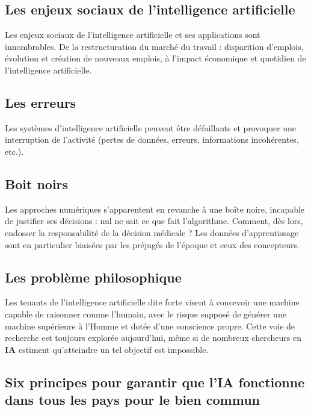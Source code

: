 \begin{titlepage}
	\begin{center}
		\chapter{Les enjeux sociaux de l'intelligence artificielle}
		\minitoc

		\vspace{5cm}
		\pgfspectra[element=He,absorption]
	\end{center}
	\vfill %
\end{titlepage}
\pagestyle{monstyle}\setcounter{page}{7}

Les enjeux sociaux de l'intelligence artificielle et ses
applications sont innombrables. De la restructuration du marché du
travail : disparition d'emplois, évolution et création de nouveaux
emplois, à l'impact économique et quotidien de l'intelligence
artificielle.

\section{Les erreurs}
Les systèmes d'intelligence artificielle peuvent être défaillants et provoquer
une interruption de l'activité (pertes de données, erreurs, informations
incohérentes, etc.).
\section{Boit noirs}
Les approches numériques s'apparentent en revanche à une boîte
noire, incapable de justifier ses décisions : nul ne sait ce que
fait l'algorithme. Comment, dès lors, endosser la responsabilité
de la décision médicale ? Les données d'apprentissage sont en
particulier biaisées par les préjugés de l'époque et ceux des
concepteurs.
\section{Les problème philosophique}
Les tenants de l'intelligence artificielle dite forte visent à
concevoir une machine capable de raisonner comme l'humain, avec le
risque supposé de générer une machine supérieure à l'Homme et dotée
d'une conscience propre. Cette voie de recherche est toujours explorée
aujourd'hui, même si de nombreux chercheurs en \textbf{IA} estiment
qu'atteindre un tel objectif est impossible.

\section{Six principes pour garantir que l'IA fonctionne dans tous les pays pour le bien commun}

